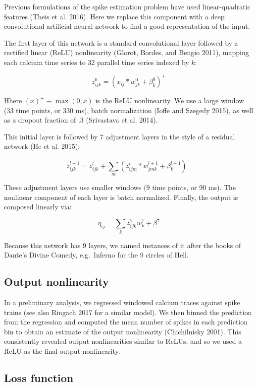 \documentclass[]{article}
\begin{document}
Previous formulations of the spike estimation problem have used
linear-quadratic features (Theis et al. 2016). Here we replace this
component with a deep convolutional artificial neural network to find a
good representation of the input.

The first layer of this network is a standard convolutional layer
followed by a rectified linear (ReLU) nonlinearity (Glorot, Bordes, and
Bengio 2011), mapping each calcium time series to 32 parallel time
series indexed by \(k\):

\[
z^0_{ijk} = (x_{ij} * w_{jk}^0 + \beta_k^0)^+
\]

Hhere \((x)^+ \equiv \max(0, x)\) is the ReLU nonlinearity. We use a
large window (33 time points, or 330 ms), batch normalization (Ioffe and
Szegedy 2015), as well as a dropout fraction of .3 (Srivastava et al.
2014).

This initial layer is followed by 7 adjustment layers in the style of a
residual network (He et al. 2015):

\[z^{l + 1}_{ijk} = z_{ijk}^l + \sum_m (z_{ijm}^l * w_{jmk}^{l + 1} + \beta_{k}^{l+1})^+\]

These adjustment layers use smaller windows (9 time points, or 90 ms).
The nonlinear component of each layer is batch normalized. Finally, the
output is composed linearly via:

\[\eta_{ij} = \sum_k z_{ijk}^{7}w^7_k + \beta^7\]

Because this network has 9 layers, we named instances of it after the
books of Dante's Divine Comedy, e.g.~Inferno for the 9 circles of Hell.

\subsection{Output nonlinearity}\label{output-nonlinearity}

In a preliminary analysis, we regressed windowed calcium traces against
spike trains (see also Ringach 2017 for a similar model). We then binned
the prediction from the regression and computed the mean number of
spikes in each prediction bin to obtain an estimate of the output
nonlinearity (Chichilnisky 2001). This consistently revealed output
nonlinearities similar to ReLUs, and so we used a ReLU as the final
output nonlinearity.

\subsection{Loss function}\label{loss-function}
\end{document}
